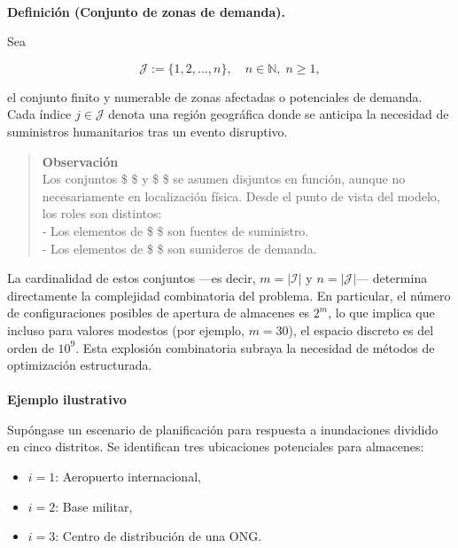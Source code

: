 \documentclass[
  spanish,
  letterpaper,
  DIV=11,
  numbers=noendperiod]{scrartcl}
\makeatletter
\let\oldparagraph\paragraph
\renewcommand{\paragraph}{
    \@ifstar
      \xxxParagraphStar
      \xxxParagraphNoStar
  }
\newcommand{\xxxParagraphStar}[1]{\oldparagraph*{#1}\mbox{}}
\newcommand{\xxxParagraphNoStar}[1]{\oldparagraph{#1}\mbox{}}
\providecommand{\tightlist}{%
  \setlength{\itemsep}{0pt}\setlength{\parskip}{0pt}}
\makeatother
\begin{document}
\paragraph{\texorpdfstring{\textbf{Definición (Conjunto de zonas de
demanda).}}{Definición (Conjunto de zonas de demanda).}}\label{definiciuxf3n-conjunto-de-zonas-de-demanda.}

Sea

\[
\mathcal{J} := \{1, 2, \dots, n\}, \quad n \in \mathbb{N},\; n \geq 1,
\]

el conjunto finito y numerable de zonas afectadas o potenciales de
demanda. Cada índice \(j \in \mathcal{J}\) denota una región geográfica
donde se anticipa la necesidad de suministros humanitarios tras un
evento disruptivo.

\begin{quote}
\textbf{Observación}\\
Los conjuntos \$  \$ y \$  \$ se asumen disjuntos
en función, aunque no necesariamente en localización física. Desde el
punto de vista del modelo, los roles son distintos:\\
- Los elementos de \$  \$ son fuentes de suministro.\\
- Los elementos de \$  \$ son sumideros de demanda.
\end{quote}

La cardinalidad de estos conjuntos ---es decir, \(m = |\mathcal{I}|\) y
\(n = |\mathcal{J}|\)--- determina directamente la complejidad
combinatoria del problema. En particular, el número de configuraciones
posibles de apertura de almacenes es \(2^m\), lo que implica que incluso
para valores modestos (por ejemplo, \(m = 30\)), el espacio discreto es
del orden de \(10^9\). Esta explosión combinatoria subraya la necesidad
de métodos de optimización estructurada.

\paragraph{\texorpdfstring{\textbf{Ejemplo
ilustrativo}}{Ejemplo ilustrativo}}\label{ejemplo-ilustrativo}

Supóngase un escenario de planificación para respuesta a inundaciones
dividido en cinco distritos. Se identifican tres ubicaciones potenciales
para almacenes:

\begin{itemize}
\tightlist
\item
  \(i = 1\): Aeropuerto internacional,\\
\item
  \(i = 2\): Base militar,\\
\item
  \(i = 3\): Centro de distribución de una ONG.
\end{itemize}
\end{document}

